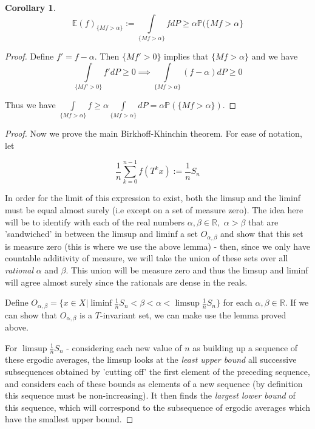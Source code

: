 \documentclass[letterpaper,10pt,oneside,onecolumn,reqno]{amsart}
\newcommand{\E}{\mathbb E}
\renewcommand{\P}{\mathbb P}
\newcommand{\R}{\mathbb R}
\theoremstyle{definition}
\newtheorem{cor}[thm]{Corollary}
\begin{document}
\begin{cor}
$$\mbox{$\E(f)_{\{Mf>\alpha\}} := \int\limits_{\{Mf>\alpha\}} fdP \geq \alpha \P(\{Mf>\alpha\}$}$$
\end{cor}
\begin{proof}
Define $f' = f - \alpha$. Then $\{Mf' > 0\}$ implies that $\{Mf > \alpha\}$ and we have
$$\mbox{$\int\limits_{\{Mf'>0\}} f'dP \geq 0 \implies \int\limits_{\{Mf>\alpha\}} (f-\alpha)dP \geq 0$}$$

Thus we have $\int\limits_{\{Mf>\alpha\}} f \geq \alpha\int\limits_{\{Mf>\alpha\}}dP = \alpha\P(\{Mf>\alpha\})$.
\end{proof}




		\begin{proof}
Now we prove the main Birkhoff-Khinchin theorem. For ease of notation, let 

$$\mbox{$\frac{1}{n}\sum\limits_{k=0}^{n-1} f(T^kx) := \frac{1}{n}S_n$}$$

In order for the limit of this expression to exist, both the limsup and the liminf must be equal almost surely (i.e except on a set of measure zero). The idea here will be to identify with each of the real numbers $\alpha, \beta \in \R,$ $\alpha > \beta$ that are 'sandwiched' in between the limsup and liminf a set $O_{\alpha,\beta}$ and show that this set is measure zero (this is where we use the above lemma) - then, since we only have countable additivity of measure, we will take the union of these sets over all \emph{rational} $\alpha$ and $\beta$. This union will be measure zero and thus the limsup and liminf will agree almost surely since the rationals are dense in the reals.

Define $O_{\alpha,\beta} = \{x \in X | \liminf \frac{1}{n}S_n < \beta < \alpha < \limsup\frac{1}{n}S_n\}$ for each $\alpha, \beta \in \R$. If we can show that $O_{\alpha,\beta}$ is a $T$-invariant set, we can make use the lemma proved above.

For $\limsup \frac{1}{n}S_n$ - considering each new value of $n$ as building up a sequence of these ergodic averages, the limsup looks at the \emph{least upper bound} all successive subsequences obtained by 'cutting off' the first element of the preceding sequence, and considers each of these bounds as elements of a new sequence (by definition this sequence must be non-increasing). It then finds the \emph{largest lower bound} of this sequence, which will correspond to the subsequence of ergodic averages which have the smallest upper bound.


\end{proof}
\end{document}
